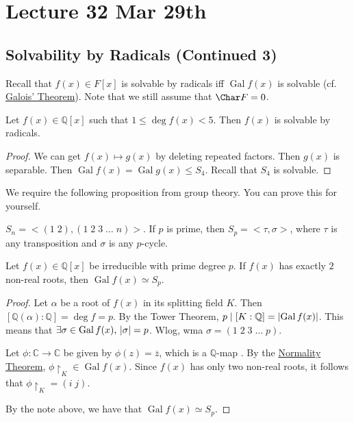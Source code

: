 \documentclass[notoc,notitlepage,nobib]{tufte-book}
\DeclareMathOperator{\Gal}{Gal}
\begin{document}


\chapter{Lecture 32 Mar 29th}%
\label{chp:lecture_32_mar_29th}

\section{Solvability by Radicals (Continued 3)}%
\label{sec:solvability_by_radicals_continued_3}

Recall that $f(x) \in F[x]$ is solvable by radicals iff $\Gal f(x)$ is solvable
(cf. \hyperref[thm:galois_theorem]{Galois' Theorem}). Note that we still assume
that $\Char F = 0$.

\begin{eg}
  Let $f(x) \in \mathbb{Q}[x]$ such that $1 \leq \deg f(x) < 5$. Then $f(x)$ is
  solvable by radicals.

  \begin{proof}
  We can get $f(x) \mapsto g(x)$ by deleting repeated factors. Then $g(x)$ is
  separable.  Then $\Gal f(x) = \Gal g(x) \leq S_4$. Recall that $S_4$ is
  solvable.
  \end{proof}
\end{eg}

We require the following proposition from group theory. You can prove this
for yourself.

\begin{note}
  $S_n = <(1 \; 2), (1 \; 2 \; 3 \; \hdots \; n)>$. If $p$ is prime, then $S_p =
  <\tau, \sigma>$, where $\tau$ is any transposition and $\sigma$ is any
  $p$-cycle.
\end{note}

\begin{lemma}
  Let $f(x) \in \mathbb{Q}[x]$ be irreducible with prime degree $p$. If $f(x)$ 
  has exactly $2$ non-real roots, then $\Gal f(x) \simeq S_p$.
\end{lemma}

\begin{proof}
  Let $\alpha$ be a root of $f(x)$ in its splitting field $K$. Then $[
  \mathbb{Q}(\alpha) : \mathbb{Q} ] = \deg f = p$. By the Tower Theorem, $p \mid
  [ K : \mathbb{Q} ] = \abs{\Gal f(x)}$. This means that $\exists \sigma \in
  \Gal f(x), \, \abs{\sigma} = p$. Wlog, wma $\sigma = (1 \; 2 \; 3 \; \hdots \;
  p)$.
  
  Let $\phi : \mathbb{C} \to \mathbb{C}$ be given by $\phi(z) = \overline{z}$,
  which is a $\mathbb{Q}$-map . By
  the \hyperref[thm:normality_theorem]{Normality Theorem}, $\phi
  \restriction_{K} \in \Gal f(x)$. Since $f(x)$ has only two non-real roots, it
  follows that $\phi \restriction_{K} = (i \; j)$.

  By the note above, we have that $\Gal f(x) \simeq S_p$.
\end{proof}
\end{document}
